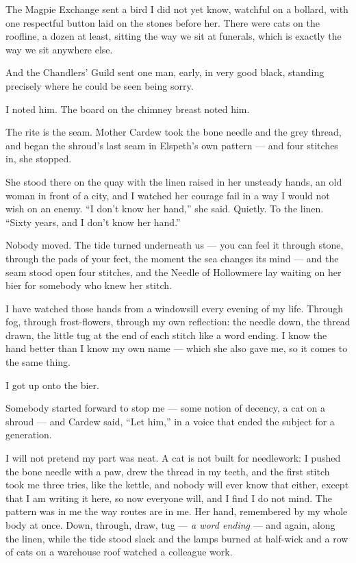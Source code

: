 The Magpie Exchange sent a bird I did not yet know, watchful on a bollard, with one respectful button laid on the stones before her. There were cats on the roofline, a dozen at least, sitting the way we sit at funerals, which is exactly the way we sit anywhere else.

And the Chandlers' Guild sent one man, early, in very good black, standing precisely where he could be seen being sorry.

I noted him. The board on the chimney breast noted him.

The rite is the seam. Mother Cardew took the bone needle and the grey thread, and began the shroud's last seam in Elspeth's own pattern --- and four stitches in, she stopped.

She stood there on the quay with the linen raised in her unsteady hands, an old woman in front of a city, and I watched her courage fail in a way I would not wish on an enemy. ``I don't know her hand,'' she said. Quietly. To the linen. ``Sixty years, and I don't know her hand.''

Nobody moved. The tide turned underneath us --- you can feel it through stone, through the pads of your feet, the moment the sea changes its mind --- and the seam stood open four stitches, and the Needle of Hollowmere lay waiting on her bier for somebody who knew her stitch.

I have watched those hands from a windowsill every evening of my life. Through fog, through frost-flowers, through my own reflection: the needle down, the thread drawn, the little tug at the end of each stitch like a word ending. I know the hand better than I know my own name --- which she also gave me, so it comes to the same thing.

I got up onto the bier.

Somebody started forward to stop me --- some notion of decency, a cat on a shroud --- and Cardew said, ``Let him,'' in a voice that ended the subject for a generation.

I will not pretend my part was neat. A cat is not built for needlework: I pushed the bone needle with a paw, drew the thread in my teeth, and the first stitch took me three tries, like the kettle, and nobody will ever know that either, except that I am writing it here, so now everyone will, and I find I do not mind. The pattern was in me the way routes are in me. Her hand, remembered by my whole body at once. Down, through, draw, tug --- \emph{a word ending} --- and again, along the linen, while the tide stood slack and the lamps burned at half-wick and a row of cats on a warehouse roof watched a colleague work.


